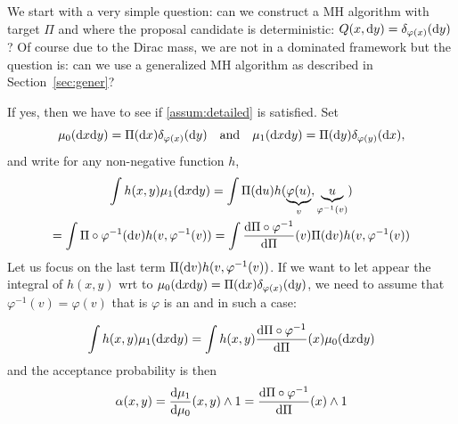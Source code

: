 \documentclass[english,graybox,envcountchap,envcountsame,sectrefs,shortlabels]{svmono}
\theoremstyle{style}
\newcommand{\eqsp}{}
\begin{document}

We start with a very simple question: can we construct a MH algorithm with target $\Pi$ and where the proposal candidate is deterministic: $Q(x,\mathrm{d} y)=\delta_{\varphi(x)}(\mathrm{d} y)$? Of course due to the Dirac mass, we are not in a dominated framework but the question is: can we use a generalized MH algorithm as described in Section~\ref{sec:gener}?

If yes, then we have to see if \ref{assum:detailed}  is satisfied. Set
$$
\mu_0(\rmd x\rmd y)=\Pi(\rmd x)\delta_{\varphi(x)}(\rmd y) \quad \mbox{and}\quad \mu_1(\rmd x\rmd y)=\Pi(\rmd y)\delta_{\varphi(y)}(\rmd x)\eqsp,
$$
and write for any non-negative function $h$,
\begin{multline*}
\int h(x,y) \mu_1(\mathrm{d} x \mathrm{d} y)= \int \Pi(\mathrm{d} u) h(\underbrace{\varphi(u)}_{v},\underbrace{u}_{\varphi^{-1}(v)})\\
=\int \Pi\circ \varphi^{-1} (\mathrm{d} v) h (v,\varphi^{-1}(v))= \int \frac{\mathrm{d} \Pi\circ \varphi^{-1}}{\mathrm{d} \Pi}(v) \Pi(\mathrm{d} v) h (v,\varphi^{-1}(v))
\end{multline*}
Let us focus on the last term $\Pi(\mathrm{d} v) h (v,\varphi^{-1}(v))$. If we want to let appear the integral of $h(x,y)$ wrt to $\mu_0(\mathrm{d} x\mathrm{d} y)=\Pi(\mathrm{d} x)\delta_{\varphi(x)}(\mathrm{d} y)$, we need to assume that $\varphi^{-1}(v)=\varphi(v)$ that is $\varphi$ is an  and in such a case:

$$
\int h(x,y) \mu_1(\mathrm{d} x \mathrm{d} y)=\int h(x,y) \frac{\mathrm{d} \Pi\circ \varphi^{-1}}{\mathrm{d} \Pi}(x) \mu_0(\mathrm{d} x\mathrm{d} y)
$$
and the acceptance probability is then
$$
\alpha(x,y)=\frac{\mathrm{d} \mu_1}{\mathrm{d} \mu_0}(x,y) \wedge 1=\frac{\mathrm{d} \Pi\circ \varphi^{-1}}{\mathrm{d} \Pi}(x) \wedge 1
$$
\end{document}
